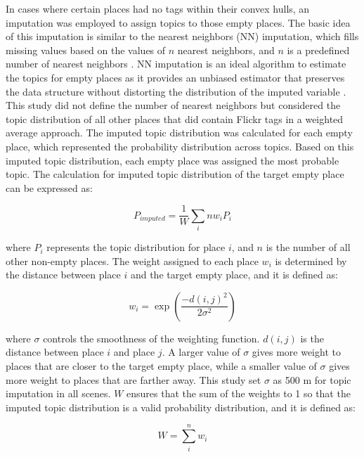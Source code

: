 \documentclass{article}
\theoremstyle{remark}
\begin{document}
In cases where certain places had no tags within their convex hulls, an imputation was employed to assign topics to those empty places. The basic idea of this imputation is similar to the nearest neighbors (NN) imputation, which fills missing values based on the values of $n$ nearest neighbors, and $n$ is a predefined number of nearest neighbors \citep{troyanskaya_missing_2001}. NN imputation is an ideal algorithm to estimate the topics for empty places as it provides an unbiased estimator that preserves the data structure without distorting the distribution of the imputed variable \citep{beretta_nearest_2016}. This study did not define the number of nearest neighbors but considered the topic distribution of all other places that did contain Flickr tags in a weighted average approach. The imputed topic distribution was calculated for each empty place, which represented the probability distribution across topics. Based on this imputed topic distribution, each empty place was assigned the most probable topic. The calculation for imputed topic distribution of the target empty place can be expressed as:

\begin{equation} \label{eq:topic_imputation}
    P_{imputed} = \frac{1}{W}\sum_{i}{n}w_{i}P_{i}
\end{equation}

where $P_{i}$ represents the topic distribution for place $i$, and $n$ is the number of all other non-empty places. The weight assigned to each place $w_{i}$ is determined by the distance between place $i$ and the target empty place, and it is defined as:

\begin{equation} \label{eq:topic_imputation_w_i}
    w_{i} = \exp(\frac{-d(i,j)^2}{2\sigma^2})
\end{equation}

where $\sigma$ controls the smoothness of the weighting function. $d(i,j)$ is the distance between place $i$ and place $j$. A larger value of $\sigma$ gives more weight to places that are closer to the target empty place, while a smaller value of $\sigma$ gives more weight to places that are farther away. This study set $\sigma$ as 500 m for topic imputation in all scenes. $W$ ensures that the sum of the weights to 1 so that the imputed topic distribution is a valid probability distribution, and it is defined as:

\begin{equation} \label{eq:topic_imputation_W}
    W = \sum_{i}^{n}w_{i}
\end{equation}
\end{document}
